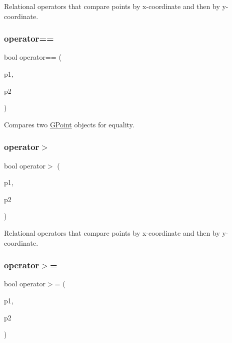 Relational operators that compare points by x-\/coordinate and then by y-\/coordinate. 

\mbox{\label{structGPoint_a128ff5199debc26d8f040bbd46f40a67}} 
\subsubsection{\texorpdfstring{operator==}{operator==}}
{\footnotesize\ttfamily bool operator== (\begin{DoxyParamCaption}\item[{const \mbox{\hyperlink{structGPoint}{G\+Point}} \&}]{p1,  }\item[{const \mbox{\hyperlink{structGPoint}{G\+Point}} \&}]{p2 }\end{DoxyParamCaption})\hspace{0.3cm}{\ttfamily [friend]}}



Compares two \mbox{\hyperlink{structGPoint}{G\+Point}} objects for equality. 

\mbox{\label{structGPoint_a2ef77d4bff099bb0440be3bde3341bd1}} 
\subsubsection{\texorpdfstring{operator$>$}{operator>}}
{\footnotesize\ttfamily bool operator$>$ (\begin{DoxyParamCaption}\item[{const \mbox{\hyperlink{structGPoint}{G\+Point}} \&}]{p1,  }\item[{const \mbox{\hyperlink{structGPoint}{G\+Point}} \&}]{p2 }\end{DoxyParamCaption})\hspace{0.3cm}{\ttfamily [friend]}}



Relational operators that compare points by x-\/coordinate and then by y-\/coordinate. 

\mbox{\label{structGPoint_a0f6d51aeb0175e5c7ae32b43f732a742}} 
\subsubsection{\texorpdfstring{operator$>$=}{operator>=}}
{\footnotesize\ttfamily bool operator$>$= (\begin{DoxyParamCaption}\item[{const \mbox{\hyperlink{structGPoint}{G\+Point}} \&}]{p1,  }\item[{const \mbox{\hyperlink{structGPoint}{G\+Point}} \&}]{p2 }\end{DoxyParamCaption})\hspace{0.3cm}{\ttfamily [friend]}}



